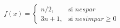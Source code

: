 \documentclass[preview]{standalone}
\begin{document}
\begin{align*}
f(x) = \begin{cases} n/2, & \text{si } n es par \\ 3n+1, & \text{si } n es impar \geq 0 \end{cases}
\end{align*}
\end{document}
